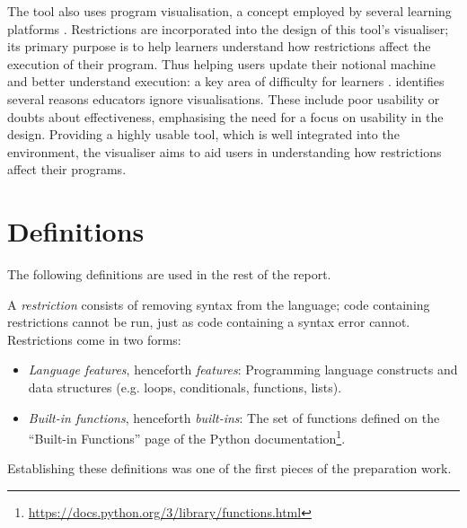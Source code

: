 The tool also uses program visualisation, a concept employed by several learning platforms \cite{annamaa_introducing_2015, guo_online_2013}. Restrictions are incorporated into the design of this tool's visualiser; its primary purpose is to help learners understand how restrictions affect the execution of their program. Thus helping users update their notional machine and better understand execution: a key area of difficulty for learners \cite{lahtinen_study_2005}. \citet{sorva_review_2013} identifies several reasons educators ignore visualisations. These include poor usability or doubts about effectiveness, emphasising the need for a focus on usability in the design. Providing a highly usable tool, which is well integrated into the environment, the visualiser aims to aid users in understanding how restrictions affect their programs.

\section{Definitions}
The following definitions are used in the rest of the report.

A \textit{restriction} consists of removing syntax from the language; code containing restrictions cannot be run, just as code containing a syntax error cannot. Restrictions come in two forms: 
\begin{itemize}
    \item \textit{Language features}, henceforth \textit{features}: 
    Programming language constructs and data structures (e.g. loops, conditionals, functions, lists).
    \item \textit{Built-in functions}, henceforth \textit{built-ins}: The set of functions defined on the ``Built-in Functions'' page of the Python documentation\footnote{\href{https://docs.python.org/3/library/functions.html}{https://docs.python.org/3/library/functions.html}}.
\end{itemize}

Establishing these definitions was one of the first pieces of the preparation work.